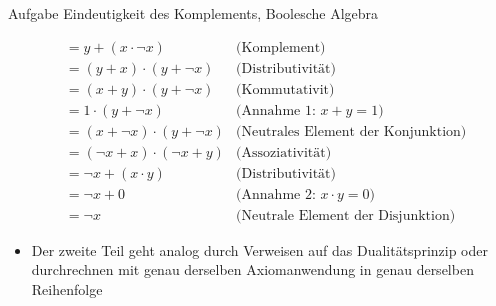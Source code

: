 \begin{frame}[allowframebreaks]{Aufgabe \thesection}{Eindeutigkeit des Komplements, Boolesche Algebra}
\begin{solutionnoinc}
\begin{align*}
      &= y + (x \cdot \neg x)          & \text{(Komplement)}\\
      &= (y + x) \cdot (y + \neg x)      & \text{(Distributivität)}\\
      &= (x + y) \cdot (y + \neg x)      & \text{(Kommutativit)}\\
      &= 1 \cdot (y + \neg x)            & \text{(Annahme 1: } x + y = 1 \text{)}\\
      &= (x + \neg x) \cdot (y + \neg x) & \text{(Neutrales Element der Konjunktion)}\\
      &= (\neg x + x) \cdot (\neg x + y) & \text{(Assoziativität)}\\
      &= \neg x + (x \cdot y)            & \text{(Distributivität)}\\
      &= \neg x + 0                      & \text{(Annahme 2: } x \cdot y = 0 \text{)} \\
      &= \neg x                          & \text{(Neutrale Element der Disjunktion)}
    \end{align*}
  \end{solutionnoinc}
  \begin{solutionnoinc}
  \end{solutionnoinc}
  \begin{Sidenote}
    \begin{itemize}
      \item Der zweite Teil geht analog durch Verweisen auf das Dualitätsprinzip oder durchrechnen mit genau derselben Axiomanwendung in genau derselben Reihenfolge
    \end{itemize}
  \end{Sidenote}
\end{frame}
